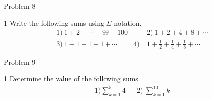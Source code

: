 \begin{opgavetekst}{Problem 8}
\end{opgavetekst}
\begin{delopgave}{1}
	Write the following sums using $\Sigma$-notation. 
	\begin{align*}
		&1) \ 1 + 2 + \cdots + 99 + 100 &  &2) \ 1 + 2 + 4 + 8 + \cdots \\
		&3) \ 1 - 1 + 1 - 1 + \cdots & 4) \ & 1 + \frac{1}{2} + \frac{1}{4} + \frac{1}{8} + \cdots
	\end{align*}
\end{delopgave}

\begin{opgavetekst}{Problem 9}
\end{opgavetekst}
\begin{delopgave}{1}
	Determine the value of the following sums
	\begin{align*}
		&1) \sum_{k = 1}^5 4 & &2) \ \sum_{k = 1}^{10} k \\
	\end{align*}
\end{delopgave}